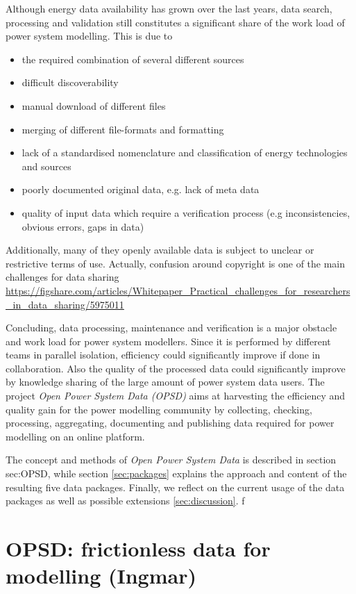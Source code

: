 \documentclass[article]{elsarticle}
\begin{document}
Although energy data availability has grown over the last years, data search, processing and validation still constitutes a significant share of the work load of power system modelling. This is due to
\begin{itemize}
    \item the required combination of several different sources
    \item difficult discoverability
    \item manual download of different files
    \item merging of different file-formats and formatting
    \item lack of a standardised nomenclature and classification of energy technologies and sources
    \item poorly documented original data, e.g. lack of meta data
    \item quality of input data which require a verification process (e.g inconsistencies, obvious errors, gaps in data)
\end{itemize}

Additionally, many of they openly available data is subject to unclear or restrictive terms of use. Actually, confusion around copyright is one of the main challenges for data sharing \url{https://figshare.com/articles/Whitepaper_Practical_challenges_for_researchers_in_data_sharing/5975011}

Concluding, data processing, maintenance and verification is a major obstacle and work load for power system modellers. Since it is performed by different teams in parallel isolation, efficiency could significantly improve if done in collaboration. Also the quality of the processed data could significantly improve by knowledge sharing of the large amount of power system data users. The project \textit{Open Power System Data (OPSD)} aims at harvesting the efficiency and quality gain for the power modelling community by collecting, checking, processing, aggregating, documenting and publishing data required for power modelling on an online platform. 

The concept and methods of \textit{Open Power System Data} is described in section \re
{sec:OPSD}, while section \ref{sec:packages} explains the approach and content of the resulting five data packages. Finally, we reflect on the current usage of the data packages as well as possible extensions \ref{sec:discussion}.    f
\section{OPSD: frictionless data for modelling (Ingmar)}
\label{OPSD}
\end{document}
